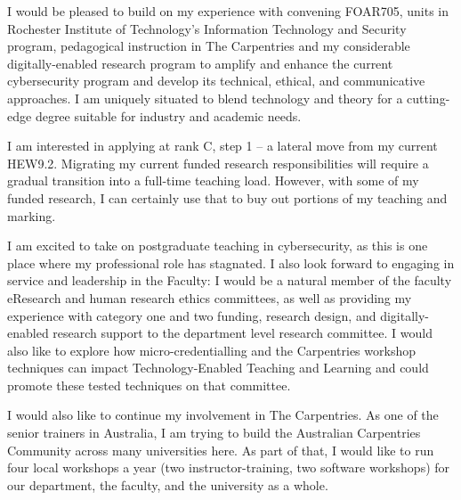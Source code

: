 \documentclass[11pt, a4paper]{awesome-cv}
\begin{document}
\begin{cvletter}
I would be pleased to build on my experience with convening FOAR705, units in Rochester Institute of Technology's Information Technology and Security program, pedagogical instruction in The Carpentries and my considerable digitally-enabled research program to amplify and enhance the current cybersecurity program and develop its technical, ethical, and communicative approaches. I am uniquely situated to blend technology and theory for a cutting-edge degree suitable for industry and academic needs. 



I am interested in applying at rank C, step 1 -- a lateral move from my current HEW9.2. Migrating my current funded research responsibilities will require a gradual transition into a full-time teaching load. However, with some of my funded research, I can certainly use that to buy out portions of my teaching and marking.

I am excited to take on postgraduate teaching in cybersecurity, as this is one place where my professional role has stagnated. I also look forward to engaging in service and leadership in the Faculty: I would be a natural member of the faculty eResearch and human research ethics committees, as well as providing my experience with category one and two funding, research design, and digitally-enabled research support to the department level research committee. I would also like to explore how micro-credentialling and the Carpentries workshop techniques can impact Technology-Enabled Teaching and Learning and could promote these tested techniques on that committee. 

I would also like to continue my involvement in The Carpentries. As one of the senior trainers in Australia, I am trying to build the Australian Carpentries Community across many universities here. As part of that, I would like to run four local workshops a year (two instructor-training, two software workshops) for our department, the faculty, and the university as a whole. 




\end{cvletter}




\makeletterclosing
\end{document}
